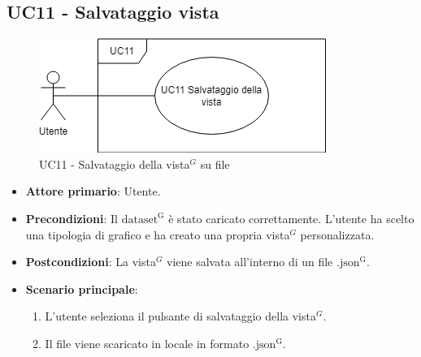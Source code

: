 \subsection{UC11 - Salvataggio vista}
\label{sec:UC11}
\begin{figure}[h!]
    \centering
    \includegraphics[scale=0.60]{../../assets/salvataggio_vista.png}
    \caption{UC11 - Salvataggio della vista$^{G}$ su file}
\end{figure}
\begin{itemize}
    \item \textbf{Attore primario}: Utente.
    \item \textbf{Precondizioni}: Il ${\mathrm{dataset^{G}}}$ è stato caricato correttamente. L'utente ha scelto una tipologia di grafico e ha creato una propria vista$^{G}$ personalizzata.
    \item \textbf{Postcondizioni}: La vista$^{G}$ viene salvata all'interno di un file ${\mathrm{.json^{G}}}$.
    \item \textbf{Scenario principale}:
          \begin{enumerate}
              \item L'utente seleziona il pulsante di salvataggio della vista$^{G}$.
              \item Il file viene scaricato in locale in formato ${\mathrm{.json^{G}}}$.
          \end{enumerate}
\end{itemize}

\newpage


